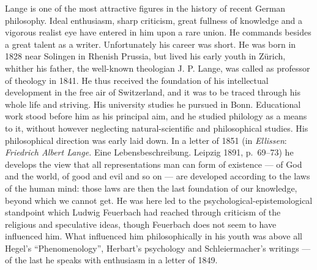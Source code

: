 \documentclass[12pt,a4paper]{book}
\newcommand{\opage}[1]{\marginnote{\footnotesize\textit{[#1]}}}
\begin{document}
Lange is one of the most attractive figures in the history of recent German
philosophy. Ideal enthusiasm, sharp criticism, great fullness of knowledge and a
vigorous realist eye have entered in him upon a rare union. He commands besides a
great talent as a writer. Unfortunately his career was short. He was born in 1828
near Solingen in Rhenish Prussia, but lived his early youth in Zürich, whither
his father, the well-known theologian J. P. Lange, was called as professor of
theology in 1841. He thus received the foundation of his intellectual development
in the free air of Switzerland, and it was to be traced through his whole life
and striving. His university studies he pursued in Bonn. Educational work stood
before him as his principal aim, and he studied philology as a means to it,
without however neglecting natural-scientific and philosophical studies. His
philosophical direction was early laid down. In a letter of 1851 (in \emph{Ellissen}:
\textit{Friedrich Albert Lange.} Eine Lebensbeschreibung. Leipzig 1891,
p.~69--73) he develops the view that all representations man can form of
existence --- of God and the world, \opage{545}of good and evil and so on --- are developed
according to the laws of the human mind: those laws are then the last foundation
of our knowledge, beyond which we cannot get. He was here led to the
psychological-epistemological standpoint which Ludwig Feuerbach had reached
through criticism of the religious and speculative ideas, though Feuerbach does
not seem to have influenced him. What influenced him philosophically in his youth
was above all Hegel's ``Phenomenology'', Herbart's psychology and
Schleiermacher's writings --- of the last he speaks with enthusiasm in a letter
of 1849.
\end{document}
